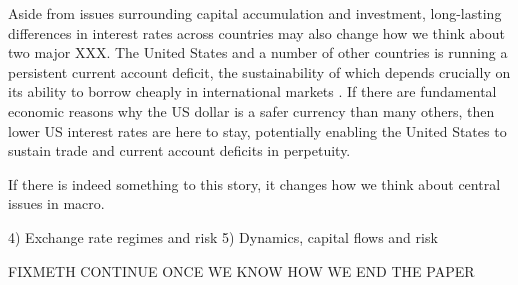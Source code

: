 Aside from issues surrounding capital accumulation and investment,
long-lasting differences in interest rates across countries may also
change how we think about two major XXX. The United States and a
number of other countries is running a persistent current account
deficit, the sustainability of which depends crucially on its ability
to borrow cheaply in international markets \citep{GourinchasRey2007}.
If there are fundamental economic reasons why the US dollar is a safer
currency than many others, then lower US interest rates are here to
stay, potentially enabling the United States to sustain trade and
current account deficits in perpetuity.

If there is indeed something to this story, it changes how we think
about central issues in macro.

4) Exchange rate regimes and risk 5) Dynamics, capital flows and risk

FIXMETH CONTINUE ONCE WE KNOW HOW WE END THE PAPER